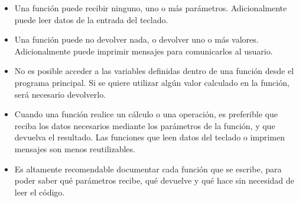 \begin{itemize}
\item Una función puede recibir ninguno, uno o más parámetros.
Adicionalmente puede leer datos de la entrada del teclado.
\item Una función puede no devolver nada, o devolver uno o más valores.
Adicionalmente puede imprimir mensajes para
comunicarlos al usuario.
\item No es posible acceder a las variables definidas dentro de una función
desde el programa principal. Si se quiere utilizar algún valor calculado en
la función, será necesario devolverlo.
\item Cuando una función realice un cálculo o una operación,
es preferible que reciba los datos necesarios mediante los parámetros de
la función, y que devuelva el resultado. Las funciones que
leen datos del teclado o imprimen mensajes son menos reutilizables.
\item Es altamente recomendable documentar cada función que se
escribe, para poder saber qué parámetros recibe, qué devuelve y qué
hace sin necesidad de leer el código.
\end{itemize}


